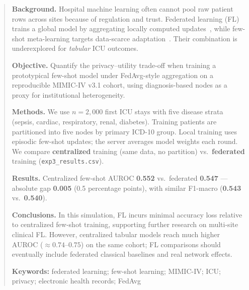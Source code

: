 \begin{abstract}
\noindent\textbf{Background.} Hospital machine learning often cannot pool raw patient rows across sites because of regulation and trust. Federated learning (FL) trains a global model by aggregating locally computed updates~\citep{mcmahan2017communication}, while few-shot meta-learning targets data-scarce adaptation~\citep{snell2017prototypical,finn2017model}. Their combination is underexplored for \emph{tabular} ICU outcomes.

\noindent\textbf{Objective.} Quantify the privacy--utility trade-off when training a prototypical few-shot model under FedAvg-style aggregation on a reproducible MIMIC-IV v3.1 cohort, using diagnosis-based nodes as a proxy for institutional heterogeneity.

\noindent\textbf{Methods.} We use $n{=}2{,}000$ first ICU stays with five disease strata (sepsis, cardiac, respiratory, renal, diabetes). Training patients are partitioned into five nodes by primary ICD-10 group. Local training uses episodic few-shot updates; the server averages model weights each round. We compare \textbf{centralized} training (same data, no partition) vs.\ \textbf{federated} training (\texttt{exp3\_results.csv}).

\noindent\textbf{Results.} Centralized few-shot AUROC \textbf{0.552} vs.\ federated \textbf{0.547} --- absolute gap \textbf{0.005} (0.5 percentage points), with similar F1-macro (\textbf{0.543} vs.\ \textbf{0.540}).

\noindent\textbf{Conclusions.} In this simulation, FL incurs minimal accuracy loss relative to centralized few-shot training, supporting further research on multi-site clinical FL. However, centralized tabular models reach much higher AUROC ($\approx 0.74$--$0.75$) on the same cohort; FL comparisons should eventually include federated classical baselines and real network effects.

\medskip
\noindent\textbf{Keywords:} federated learning; few-shot learning; MIMIC-IV; ICU; privacy; electronic health records; FedAvg
\end{abstract}
